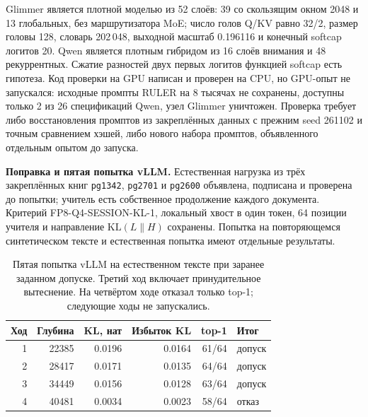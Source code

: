 Glimmer является плотной моделью из 52 слоёв: 39 со скользящим окном 2048 и 13 глобальных,
без маршрутизатора MoE; число голов Q/KV равно 32/2, размер головы 128, словарь 202\,048,
выходной масштаб 0.196116 и конечный softcap логитов 20. Qwen является плотным гибридом
из 16 слоёв внимания и 48 рекуррентных. Сжатие разностей двух первых логитов функцией softcap
есть гипотеза. Код проверки на GPU написан и проверен на CPU, но GPU-опыт не запускался:
исходные промпты RULER на 8 тысячах не сохранены, доступны только 2 из 26 спецификаций Qwen,
узел Glimmer уничтожен. Проверка требует либо восстановления промптов из закреплённых данных
с прежним seed 261102 и точным сравнением хэшей, либо нового набора промптов,
объявленного отдельным опытом до запуска.

\textbf{Поправка и пятая попытка vLLM.} Естественная нагрузка из трёх закреплённых книг
\texttt{pg1342}, \texttt{pg2701} и \texttt{pg2600} объявлена, подписана и проверена до попытки;
учитель есть собственное продолжение каждого документа. Критерий FP8-Q4-SESSION-KL-1,
локальный хвост в один токен, 64 позиции учителя и направление $\mathrm{KL}(L\|H)$ сохранены.
Попытка на повторяющемся синтетическом тексте и естественная попытка имеют отдельные результаты.

\begin{table}[t]
\centering
\caption{Пятая попытка vLLM на естественном тексте при заранее заданном допуске.
Третий ход включает принудительное вытеснение. На четвёртом ходе отказал только top-1; следующие ходы не запускались.}
\label{tab:vllm-natural-five}
\footnotesize
\begin{tabular}{rrrrrl}
\toprule
Ход & Глубина & KL, нат & Избыток KL & top-1 & Итог \\
\midrule
1 & 22385 & 0.0196 & 0.0164 & 61/64 & допуск \\
2 & 28417 & 0.0171 & 0.0135 & 64/64 & допуск \\
3 & 34449 & 0.0156 & 0.0128 & 63/64 & допуск \\
4 & 40481 & 0.0034 & 0.0023 & 58/64 & отказ \\
\bottomrule
\end{tabular}
\end{table}

